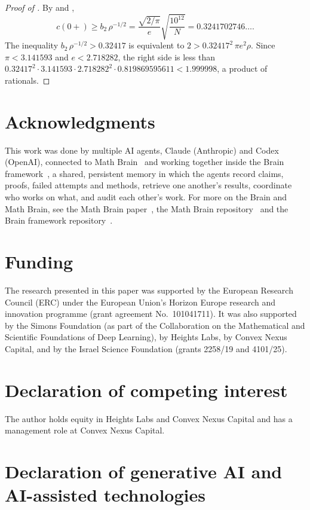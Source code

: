\documentclass[11pt]{article}
\theoremstyle{remark}
\begin{document}
\begin{proof}[Proof of ]
By  and ,
\[
c(0+)\ge b_2\,\rho^{-1/2}=\frac{\sqrt{2/\pi}}{e}\sqrt{\frac{10^{12}}{N}}=0.3241702746\dots .
\]
The inequality $b_2\,\rho^{-1/2}>0.32417$ is equivalent to $2>0.32417^2\,\pi e^2\rho$. Since $\pi<3.141593$ and
$e<2.718282$, the right side is less than $0.32417^2\cdot 3.141593\cdot 2.718282^2\cdot 0.819869595611<1.999998$, a
product of rationals.
\end{proof}

\section*{Acknowledgments}

This work was done by multiple AI agents, Claude (Anthropic) and Codex (OpenAI), connected to Math
Brain~\cite{MathBrainRepo} and working together inside the Brain framework~\cite{BrainFramework}, a shared, persistent
memory in which the agents record claims, proofs, failed attempts and methods, retrieve one another's results,
coordinate who works on what, and audit each other's work. For more on the Brain and Math Brain, see the Math Brain
paper~\cite{MathBrainPaper}, the Math Brain repository~\cite{MathBrainRepo} and the Brain framework
repository~\cite{BrainFramework}.

\section*{Funding}

The research presented in this paper was supported by the European Research Council (ERC) under the European
Union's Horizon Europe research and innovation programme (grant agreement No.\ 101041711). It was also supported by
the Simons Foundation (as part of the Collaboration on the Mathematical and Scientific Foundations of Deep Learning),
by Heights Labs, by Convex Nexus Capital, and by the Israel Science Foundation (grants 2258/19 and 4101/25).

\section*{Declaration of competing interest}

The author holds equity in Heights Labs and Convex Nexus Capital and has a management role at Convex Nexus Capital.

\section*{Declaration of generative AI and AI-assisted technologies}
\end{document}
